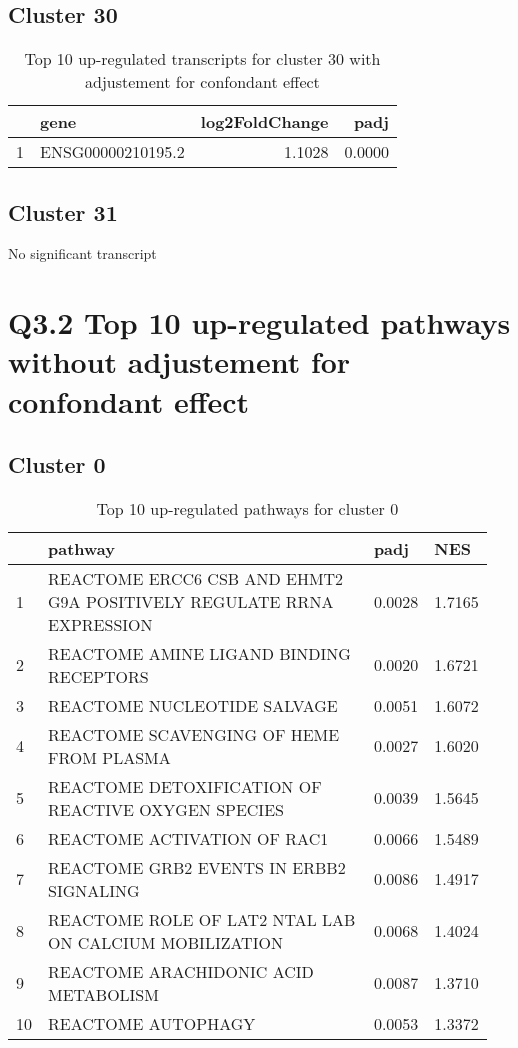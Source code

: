 \documentclass{article}
\begin{document}
\subsection{Cluster 30 }
\begin{table}[H]
\centering
\begin{tabular}{rlrr}
  \hline
 & gene & log2FoldChange & padj \\ 
  \hline
1 & ENSG00000210195.2 & 1.1028 & 0.0000 \\ 
   \hline
\end{tabular}
\caption{Top 10 up-regulated transcripts for cluster 30 with adjustement for confondant effect} 
\label{tab:q3_1_conf_30}
\end{table}
\subsection{Cluster 31 }
No significant transcript
\section{Q3.2 Top 10 up-regulated pathways without adjustement for confondant effect}
\subsection{Cluster 0 }
\begin{table}[H]
\centering
\begin{tabular}{p{0.05\linewidth}p{0.7\linewidth}p{0.1\linewidth}p{0.1\linewidth}}
  \hline
 & pathway & padj & NES \\ 
  \hline
1 & REACTOME ERCC6 CSB AND EHMT2 G9A POSITIVELY REGULATE RRNA EXPRESSION & 0.0028 & 1.7165 \\ 
  2 & REACTOME AMINE LIGAND BINDING RECEPTORS & 0.0020 & 1.6721 \\ 
  3 & REACTOME NUCLEOTIDE SALVAGE & 0.0051 & 1.6072 \\ 
  4 & REACTOME SCAVENGING OF HEME FROM PLASMA & 0.0027 & 1.6020 \\ 
  5 & REACTOME DETOXIFICATION OF REACTIVE OXYGEN SPECIES & 0.0039 & 1.5645 \\ 
  6 & REACTOME ACTIVATION OF RAC1 & 0.0066 & 1.5489 \\ 
  7 & REACTOME GRB2 EVENTS IN ERBB2 SIGNALING & 0.0086 & 1.4917 \\ 
  8 & REACTOME ROLE OF LAT2 NTAL LAB ON CALCIUM MOBILIZATION & 0.0068 & 1.4024 \\ 
  9 & REACTOME ARACHIDONIC ACID METABOLISM & 0.0087 & 1.3710 \\ 
  10 & REACTOME AUTOPHAGY & 0.0053 & 1.3372 \\ 
   \hline
\end{tabular}
\caption{Top 10 up-regulated pathways for cluster 0} 
\label{tab:q3_2_0}
\end{table}
\end{document}
